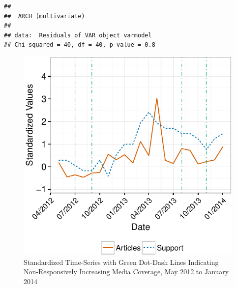\documentclass[12pt,]{article}
\makeatletter
\def\maxwidth{\ifdim\Gin@nat@width>\linewidth\linewidth
\else\Gin@nat@width\fi}
\let\Oldincludegraphics\includegraphics
\renewcommand{\includegraphics}[1]{\Oldincludegraphics[width=\maxwidth]{#1}}
\makeatother
\begin{document}
\begin{verbatim}
## 
##  ARCH (multivariate)
## 
## data:  Residuals of VAR object varmodel
## Chi-squared = 40, df = 40, p-value = 0.8
\end{verbatim}

\newpage

\begin{figure}[htbp]
\centering
\includegraphics{ukip_media_files/figure-latex/qual-zoomed-plot-1.pdf}
\caption{Standardized Time-Series with Green Dot-Dash Lines Indicating
Non-Responsively Increasing Media Coverage, May 2012 to January 2014}
\end{figure}

\newpage


\end{document}
